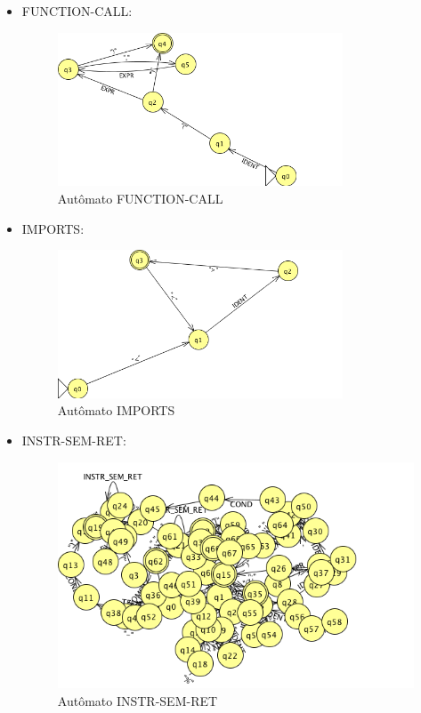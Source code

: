 \begin{itemize}
	\item FUNCTION-CALL:
	\begin{figure}[H]
		\centering 
		\includegraphics[width=0.8\textwidth]{images/submaquinas/FUNCTION-CALL.png}  
		\caption{Autômato FUNCTION-CALL}
	\end{figure}
	
	\item IMPORTS:
	\begin{figure}[H]
		\centering 
		\includegraphics[width=0.8\textwidth]{images/submaquinas/IMPORTS.png}  
		\caption{Autômato IMPORTS}
	\end{figure}
	
	\item INSTR-SEM-RET:
	\begin{figure}[H]
		\centering 
		\includegraphics[width=1.0\textwidth]{images/submaquinas/INSTR-SEM-RET.png}  
		\caption{Autômato INSTR-SEM-RET}
	\end{figure}
	

\end{itemize}
